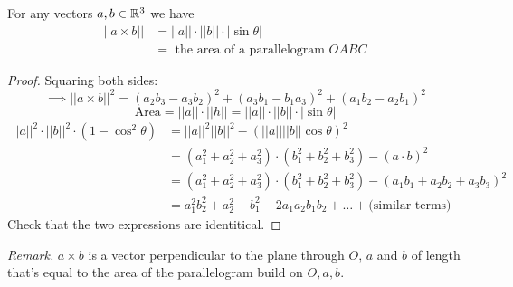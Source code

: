 \documentclass[10pt]{scrartcl}
\begin{document}


\begin{proposition}
For any {\normalfont {}}vectors $a,b \in\mathbb{R}^3$ we have 
\begin{align*}
  ||a\times b|| &= ||a|| \cdot ||b|| \cdot |\sin\theta|\\
 &= \text{ the area of a parallelogram } OABC
\end{align*}
\end{proposition}

%

\begin{proof}
Squaring both sides: 
\[
  \implies ||a\times b||^2 = (a_2b_3 - a_3b_2)^2 + (a_3b_1 - b_1a_3)^2 + (a_1b_2 - a_2b_1)^2
\]
\[
  \text{Area} = ||a|| \cdot ||h|| = ||a|| \cdot ||b|| \cdot |\sin\theta|
\]
\begin{align*}
  ||a||^2 \cdot ||b||^2 \cdot(1-\cos^2\theta) &= ||a||^2||b||^2 - (||a||||b||\cos\theta)^2\\
  &= (a_1^2 + a_2^2 + a_3^2) \cdot(b_1^2 + b_2^2 + b_3^2) - (a\cdot b)^2\\
  &= (a_1^2 + a_2^2 + a_3^2) \cdot(b_1^2 + b_2^2 + b_3^2) - (a_1b_1 + a_2b_2 + a_3b_3)^2\\
  &= a_1^2b_2^2 + a_2^2 + b_1^2 - 2a_1a_2b_1b_2 + \dots + \text{(similar terms)}
\end{align*}
Check that the two expressions are identitical. 
\end{proof}

\emph{Remark.} $a \times b$ is a vector perpendicular to the plane through $O,\, a$ and $b$ of length that's equal to the area of the parallelogram build on $O,a,b$.\\
\end{document}
